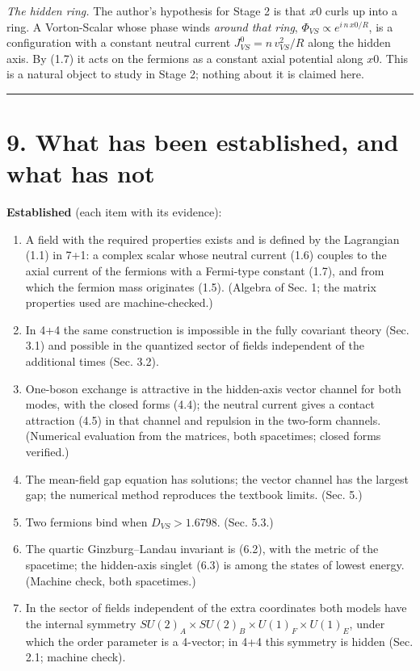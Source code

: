\documentclass[
  10pt,
]{article}
\providecommand{\tightlist}{%
  \setlength{\itemsep}{0pt}\setlength{\parskip}{0pt}}
\begin{document}
\emph{The hidden ring.} The author's hypothesis for Stage 2 is that
\(x0\) curls up into a ring. A Vorton-Scalar whose phase winds
\emph{around that ring}, \(\Phi_{VS}\propto e^{i\,n\,x0/R}\), is a
configuration with a constant neutral current \(J_{VS}^0=n\,v_{VS}^2/R\)
along the hidden axis. By (1.7) it acts on the fermions as a constant
axial potential along \(x0\). This is a natural object to study in Stage
2; nothing about it is claimed here.

\begin{center}\rule{0.5\linewidth}{0.5pt}\end{center}

\hypertarget{what-has-been-established-and-what-has-not}{%
\section{9. What has been established, and what has
not}\label{what-has-been-established-and-what-has-not}}

\textbf{Established} (each item with its evidence):

\begin{enumerate}
\def\labelenumi{\arabic{enumi}.}
\tightlist
\item
  A field with the required properties exists and is defined by the
  Lagrangian (1.1) in 7+1: a complex scalar whose neutral current (1.6)
  couples to the axial current of the fermions with a Fermi-type
  constant (1.7), and from which the fermion mass originates (1.5).
  (Algebra of Sec. 1; the matrix properties used are machine-checked.)
\item
  In 4+4 the same construction is impossible in the fully covariant
  theory (Sec. 3.1) and possible in the quantized sector of fields
  independent of the additional times (Sec. 3.2).
\item
  One-boson exchange is attractive in the hidden-axis vector channel for
  both modes, with the closed forms (4.4); the neutral current gives a
  contact attraction (4.5) in that channel and repulsion in the two-form
  channels. (Numerical evaluation from the matrices, both spacetimes;
  closed forms verified.)
\item
  The mean-field gap equation has solutions; the vector channel has the
  largest gap; the numerical method reproduces the textbook limits.
  (Sec. 5.)
\item
  Two fermions bind when \(D_{VS}>1.6798\). (Sec. 5.3.)
\item
  The quartic Ginzburg--Landau invariant is (6.2), with the metric of
  the spacetime; the hidden-axis singlet (6.3) is among the states of
  lowest energy. (Machine check, both spacetimes.)
\item
  In the sector of fields independent of the extra coordinates both
  models have the internal symmetry
  \(SU(2)_A\times SU(2)_B\times U(1)_F\times U(1)_E\), under which the
  order parameter is a 4-vector; in 4+4 this symmetry is hidden (Sec.
  2.1; machine check).
\end{enumerate}
\end{document}

